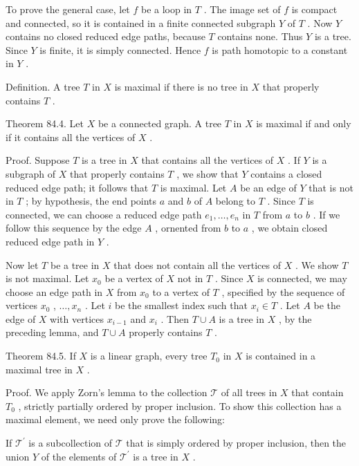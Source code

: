To prove the general case, let \(f\) be a loop in \(T\) . The image set of \(f\) is compact and connected, so it is contained in a finite connected subgraph \(Y\) of \(T\) . Now \(Y\) contains no closed reduced edge paths, because \(T\) contains none. Thus \(Y\) is a tree. Since \(Y\) is finite, it is simply connected. Hence \(f\) is path homotopic to a constant in \(Y\) .

Definition. A tree \(T\) in \(X\) is maximal if there is no tree in \(X\) that properly contains \(T\) .

Theorem 84.4. Let \(X\) be a connected graph. A tree \(T\) in \(X\) is maximal if and only if it contains all the vertices of \(X\) .

Proof. Suppose \(T\) is a tree in \(X\) that contains all the vertices of \(X\) . If \(Y\) is a subgraph of \(X\) that properly contains \(T\) , we show that \(Y\) contains a closed reduced edge path; it follows that \(T\) is maximal. Let \(A\) be an edge of \(Y\) that is not in \(T\) ; by hypothesis, the end points \(a\) and \(b\) of \(A\) belong to \(T\) . Since \(T\) is connected, we can choose a reduced edge path \({e}_{1},\ldots ,{e}_{n}\) in \(T\) from \(a\) to \(b\) . If we follow this sequence by the edge \(A\) , ornented from \(b\) to \(a\) , we obtain closed reduced edge path in \(Y\) .

Now let \(T\) be a tree in \(X\) that does not contain all the vertices of \(X\) . We show \(T\) is not maximal. Let \({x}_{0}\) be a vertex of \(X\) not in \(T\) . Since \(X\) is connected, we may choose an edge path in \(X\) from \({x}_{0}\) to a vertex of \(T\) , specified by the sequence of vertices \({x}_{0}\) , \(\ldots ,{x}_{n}\) . Let \(i\) be the smallest index such that \({x}_{i} \in  T\) . Let \(A\) be the edge of \(X\) with vertices \({x}_{i - 1}\) and \({x}_{i}\) . Then \(T \cup  A\) is a tree in \(X\) , by the preceding lemma, and \(T \cup  A\) properly contains \(T\) .

Theorem 84.5. If \(X\) is a linear graph, every tree \({T}_{0}\) in \(X\) is contained in a maximal tree in \(X\) .

Proof. We apply Zorn’s lemma to the collection \(\mathcal{T}\) of all trees in \(X\) that contain \({T}_{0}\) , strictly partially ordered by proper inclusion. To show this collection has a maximal element, we need only prove the following:

If \({\mathcal{T}}^{\prime }\) is a subcollection of \(\mathcal{T}\) that is simply ordered by proper inclusion, then the union \(Y\) of the elements of \({\mathcal{T}}^{\prime }\) is a tree in \(X\) .

